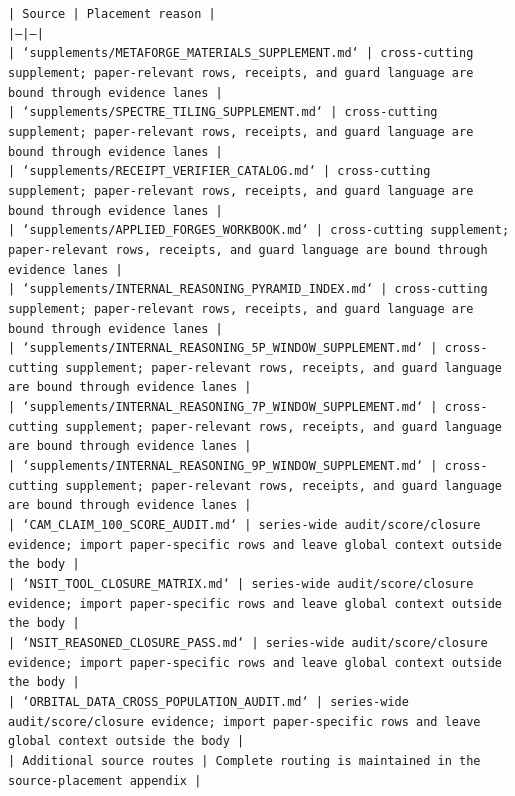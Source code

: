 \documentclass[11pt]{article}
\begin{document}
\noindent\texttt{| Source | Placement reason |}\\
\noindent\texttt{|---|---|}\\
\noindent\texttt{| `supplements/METAFORGE\_MATERIALS\_SUPPLEMENT.md` | cross-cutting supplement; paper-relevant rows, receipts, and guard language are bound through evidence lanes |}\\
\noindent\texttt{| `supplements/SPECTRE\_TILING\_SUPPLEMENT.md` | cross-cutting supplement; paper-relevant rows, receipts, and guard language are bound through evidence lanes |}\\
\noindent\texttt{| `supplements/RECEIPT\_VERIFIER\_CATALOG.md` | cross-cutting supplement; paper-relevant rows, receipts, and guard language are bound through evidence lanes |}\\
\noindent\texttt{| `supplements/APPLIED\_FORGES\_WORKBOOK.md` | cross-cutting supplement; paper-relevant rows, receipts, and guard language are bound through evidence lanes |}\\
\noindent\texttt{| `supplements/INTERNAL\_REASONING\_PYRAMID\_INDEX.md` | cross-cutting supplement; paper-relevant rows, receipts, and guard language are bound through evidence lanes |}\\
\noindent\texttt{| `supplements/INTERNAL\_REASONING\_5P\_WINDOW\_SUPPLEMENT.md` | cross-cutting supplement; paper-relevant rows, receipts, and guard language are bound through evidence lanes |}\\
\noindent\texttt{| `supplements/INTERNAL\_REASONING\_7P\_WINDOW\_SUPPLEMENT.md` | cross-cutting supplement; paper-relevant rows, receipts, and guard language are bound through evidence lanes |}\\
\noindent\texttt{| `supplements/INTERNAL\_REASONING\_9P\_WINDOW\_SUPPLEMENT.md` | cross-cutting supplement; paper-relevant rows, receipts, and guard language are bound through evidence lanes |}\\
\noindent\texttt{| `CAM\_CLAIM\_100\_SCORE\_AUDIT.md` | series-wide audit/score/closure evidence; import paper-specific rows and leave global context outside the body |}\\
\noindent\texttt{| `NSIT\_TOOL\_CLOSURE\_MATRIX.md` | series-wide audit/score/closure evidence; import paper-specific rows and leave global context outside the body |}\\
\noindent\texttt{| `NSIT\_REASONED\_CLOSURE\_PASS.md` | series-wide audit/score/closure evidence; import paper-specific rows and leave global context outside the body |}\\
\noindent\texttt{| `ORBITAL\_DATA\_CROSS\_POPULATION\_AUDIT.md` | series-wide audit/score/closure evidence; import paper-specific rows and leave global context outside the body |}\\
\noindent\texttt{| Additional source routes | Complete routing is maintained in the source-placement appendix |}\\
\end{document}
